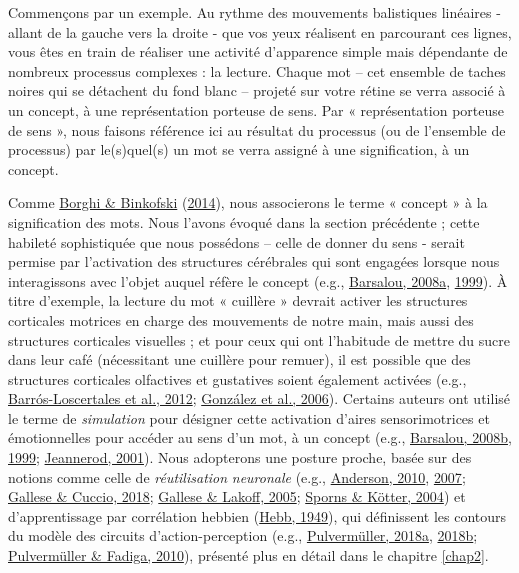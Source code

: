 \documentclass[
  a4paper,12pt,twoside,onecolumn,openright,final,oldfontcommands]{memoir}
\newcommand{\initial}[1]{
	\lettrine[lines=3,lhang=0.33,nindent=0em]{
		\color{gray}
     		{\textsc{#1}}}{}}
\begin{document}
\initial{C}ommençons par un exemple. Au rythme des mouvements balistiques linéaires - allant de la gauche vers la droite - que vos yeux réalisent en parcourant ces lignes, vous êtes en train de réaliser une activité d'apparence simple mais dépendante de nombreux processus complexes : la lecture. Chaque mot -- cet ensemble de taches noires qui se détachent du fond blanc -- projeté sur votre rétine se verra associé à un concept, à une représentation porteuse de sens. Par « représentation porteuse de sens », nous faisons référence ici au résultat du processus (ou de l'ensemble de processus) par le(s)quel(s) un mot se verra assigné à une signification, à un concept.

Comme \protect\hyperlink{ref-borghi_words_2014}{Borghi \& Binkofski} (\protect\hyperlink{ref-borghi_words_2014}{2014}), nous associerons le terme « concept » à la signification des mots. Nous l'avons évoqué dans la section précédente ; cette habileté sophistiquée que nous possédons -- celle de donner du sens - serait permise par l'activation des structures cérébrales qui sont engagées lorsque nous interagissons avec l'objet auquel réfère le concept (e.g., \protect\hyperlink{ref-barsalou_grounded_2008}{Barsalou, 2008a}, \protect\hyperlink{ref-barsalou_perceptual_1999}{1999}). À titre d'exemple, la lecture du mot « cuillère » devrait activer les structures corticales motrices en charge des mouvements de notre main, mais aussi des structures corticales visuelles ; et pour ceux qui ont l'habitude de mettre du sucre dans leur café (nécessitant une cuillère pour remuer), il est possible que des structures corticales olfactives et gustatives soient également activées (e.g., \protect\hyperlink{ref-barros-loscertales_reading_2012}{Barrós-Loscertales et al., 2012}; \protect\hyperlink{ref-gonzalez_reading_2006}{González et al., 2006}). Certains auteurs ont utilisé le terme de \emph{simulation} pour désigner cette activation d'aires sensorimotrices et émotionnelles pour accéder au sens d'un mot, à un concept (e.g., \protect\hyperlink{ref-barsalou_cognitive_2008}{Barsalou, 2008b}, \protect\hyperlink{ref-barsalou_perceptual_1999}{1999}; \protect\hyperlink{ref-jeannerod_neural_2001}{Jeannerod, 2001}). Nous adopterons une posture proche, basée sur des notions comme celle de \emph{réutilisation} \emph{neuronale} (e.g., \protect\hyperlink{ref-anderson_neural_2010}{Anderson, 2010}, \protect\hyperlink{ref-anderson_evolution_2007}{2007}; \protect\hyperlink{ref-gallese_neural_2018}{Gallese \& Cuccio, 2018}; \protect\hyperlink{ref-gallese_brains_2005}{Gallese \& Lakoff, 2005}; \protect\hyperlink{ref-sporns_motifs_2004}{Sporns \& Kötter, 2004}) et d'apprentissage par corrélation hebbien (\protect\hyperlink{ref-hebb_organization_1949}{Hebb, 1949}), qui définissent les contours du modèle des circuits d'action-perception (e.g., \protect\hyperlink{ref-pulvermuller_neural_2018}{Pulvermüller, 2018a}, \protect\hyperlink{ref-pulvermuller_neurobiological_2018}{2018b}; \protect\hyperlink{ref-pulvermuller_active_2010}{Pulvermüller \& Fadiga, 2010}), présenté plus en détail dans le chapitre \ref{chap2}.
\end{document}

